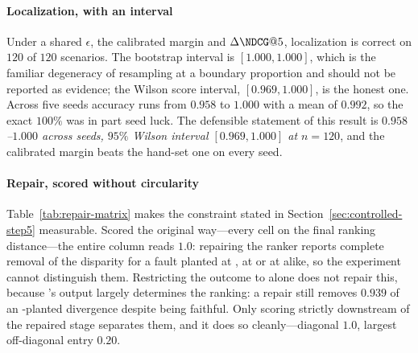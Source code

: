 \paragraph{Localization, with an interval}
Under a shared $\epsilon$, the calibrated margin and $\Delta\NDCG@5$, localization is correct on
$120$ of $120$ scenarios. The bootstrap interval is $[1.000, 1.000]$, which is the familiar
degeneracy of resampling at a boundary proportion and should not be reported as evidence; the
Wilson score interval, $[0.969, 1.000]$, is the honest one. Across five seeds accuracy runs from
$0.958$ to $1.000$ with a mean of $0.992$, so the exact $100\%$ was in part seed luck. The
defensible statement of this result is \emph{$0.958$--$1.000$ across seeds, $95\%$ Wilson interval
$[0.969, 1.000]$ at $n = 120$}, and the calibrated margin beats the hand-set one on every seed.

\paragraph{Repair, scored without circularity}
Table~\ref{tab:repair-matrix} makes the constraint stated in Section~\ref{sec:controlled-step5}
measurable. Scored the original way---every cell on the final ranking distance---the entire
 column reads $1.0$: repairing the ranker reports complete removal of the disparity
for a fault planted at , at  or at  alike, so the
experiment cannot distinguish them. Restricting the outcome to  alone does not repair
this, because 's output largely determines the ranking: a  repair
still removes $0.939$ of an -planted divergence despite  being
faithful. Only scoring strictly downstream of the repaired stage separates them, and it does so
cleanly---diagonal $1.0$, largest off-diagonal entry $0.20$.

